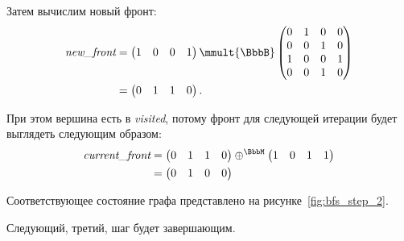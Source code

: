 \begin{example}
    Затем вычислим новый фронт:
    \begin{align*}
        \emph{new\_front} & =
        \begin{pmatrix}
            1 & 0 & 0 & 1
        \end{pmatrix} \mmult{\BbbB}
        \begin{pmatrix}
            0 & 1 & 0 & 0 \\
            0 & 0 & 1 & 0 \\
            1 & 0 & 0 & 1 \\
            0 & 0 & 1 & 0
        \end{pmatrix}        \\ &=
        \begin{pmatrix}
            0 & 1 & 1 & 0
        \end{pmatrix}.
    \end{align*}

    При этом вершина  есть в \emph{visited}, потому фронт для следующей итерации будет выглядеть следующим образом:
    \begin{align*}
        \emph{current\_front} & =
        \begin{pmatrix}
            0 & 1 & 1 & 0
        \end{pmatrix} \oplus^\BbbM
        \begin{pmatrix}
            1 & 0 & 1 & 1
        \end{pmatrix}            \\ &=
        \begin{pmatrix}
            0 & 1 & 0 & 0
        \end{pmatrix}
    \end{align*}

    \begin{marginfigure}
        \begin{center}
            \resizebox{\marginparwidth}{!}{}
        \end{center}
        \caption{Обход в ширину, шаг второй}
        \label{fig:bfs_step_2}
    \end{marginfigure}

    Соответствующее состояние графа представлено на рисунке~\ref{fig:bfs_step_2}.

    Следующий, третий, шаг будет завершающим.


\end{example}
